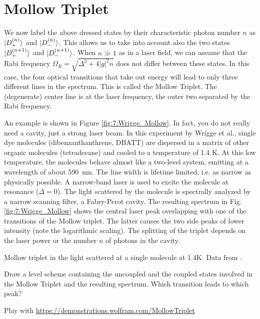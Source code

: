 \section{Mollow Triplet}

We now label the above dressed states by their characteristic photon number $n$ as $\ket{D_+^{(n)}}$ and $\ket{D_-^{(n)}}$. This allows us to take into account also the two states $\ket{D_+^{(n+1)}}$ and $\ket{D_-^{(n+1)}}$. 
When $n \gg 1$ as in a laser field,  we can assume that the Rabi frequency $\Omega_R = \sqrt{\Delta^2 + 4 |g|^2 n}$ does not differ between these states. In this case, the four optical transitions that take out energy will lead to   only three different lines in the spectrum. This is called the Mollow Triplet. The (degenerate) center line is at the laser frequency, the outer two separated by the Rabi frequency.

An example is shown in Figure \ref{fig:7:Wrigge_Mollow}. In fact, you do not really need a cavity, just a strong laser beam. In this experiment by Wrigge et al., single dye molecules (dibenzanthanthrene, DBATT) are dispersed in a matrix of other organic molecules (tetradecane) and cooled to a temperature of 1.4 K. At this low temperature, the molecules behave almost like a two-level system, emitting at a wavelength of about 590~nm. The line width is lifetime limited, i.e. as narrow as physically possible. A narrow-band laser is used to excite the molecule at resonance ($\Delta = 0$). The light scattered by the molecule is spectrally analyzed by a narrow scanning filter, a Fabry-Perot cavity. The resulting spectrum in Fig. \ref{fig:7:Wrigge_Mollow} shows the central laser peak overlapping with one of the transitions of the Mollow triplet. The latter causes the two side peaks of lower intensity (note the logarithmic scaling). The splitting of the triplet depends on the laser power or the number $n$ of photons in the cavity.

\begin{marginfigure}
  \caption{Mollow triplet in the light scattered at a single molecule at 1.4K. Data from \cite{Wrigge2007}.}
  \label{fig:7:Wrigge_Mollow}
\end{marginfigure}





\begin{questions}
\item Draw a level scheme containing the uncoupled and the coupled states involved in the Mollow Triplet and the resulting spectrum. Which transition leads to which peak?

\item Play with \href{https://demonstrations.wolfram.com/MollowTriplet/} {https://demonstrations.wolfram.com/MollowTriplet} 

\end{questions}

